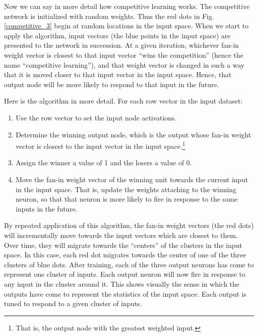 Now we can say in more detail how competitive learning works. The competitive network is initialized with random weights. Thus the red dots in Fig. \ref{competitive_3} begin at random locations in the input space. When we start to apply the algorithm, input vectors (the blue points in the input space) are presented to the network in succession. At a given iteration, whichever fan-in weight vector is closest to that input vector ``wins  the competition'' (hence the name ``competitive learning''), and that weight vector is changed in such a way that it is moved closer to that input vector in the input space. Hence, that output node will be more likely to respond to that input in the future.

Here is the algorithm in more detail. For each row vector in the input dataset:
\begin{enumerate}
\item Use the row vector to set the input node activations.
\item Determine the winning output node, which is the output whose fan-in weight vector is closest to the input vector in the input space.\footnote{That is, the output node with the greatest weighted input.} 
\item Assign the winner a value of 1 and the losers a value of 0.
\item Move the fan-in weight vector of the winning unit towards the current input in the input space. That is, update the weights attaching to the winning neuron, so that that neuron is more likely to fire in response to the same inputs in the future.
\end{enumerate}
By repeated application of this algorithm, the fan-in weight vectors (the red dots) will incrementally move towards the input vectors which are closest to them. Over time, they will migrate towards the ``centers'' of the clusters in the  input space. In this case, each red dot migrates towards the center of one of the three clusters of blue dots. After training, each of the three output neurons has come to represent one cluster of inputs. Each output neuron will now fire in response to any input in the cluster around it. This shows visually the sense in which the outputs have come to represent the statistics of the input space. Each output is tuned to respond to a given cluster of inputs. 

